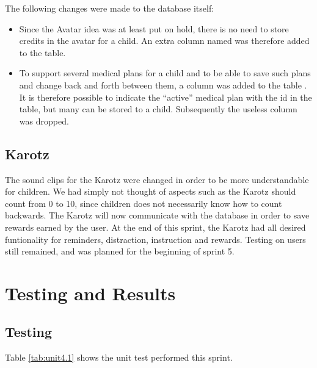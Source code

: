 The following changes were made to the database itself:
\begin{itemize}
  \item Since the Avatar idea was at least put on hold, there is no need to store credits in the avatar for a 
  		child. An extra column named  was therefore added to the  table.
  \item To support several medical plans for a child and to be able to save such plans and change back and forth between them, 
  		a column  was added to the table . It is therefore possible to indicate the ``active'' 
  		medical plan with the id in the  table, but many can be stored to a child. Subsequently the useless  
  		column was dropped. 
\end{itemize}

\subsection{Karotz}
The sound clips for the Karotz were changed in order to be more understandable for children. We had simply not thought of aspects 
such as the Karotz should count from 0 to 10, since children does not necessarily know how to count backwards. The Karotz will 
now communicate with the database in order to save rewards earned by the user. At the end of this sprint, the Karotz had all 
desired funtionality for reminders, distraction, instruction and rewards. Testing on users still remained, and was planned for 
the beginning of sprint 5.

\section{Testing and Results}
\label{sec:sprint4testingAndResults}

\subsection{Testing}
Table \ref{tab:unit4.1} shows the unit test performed this sprint.

